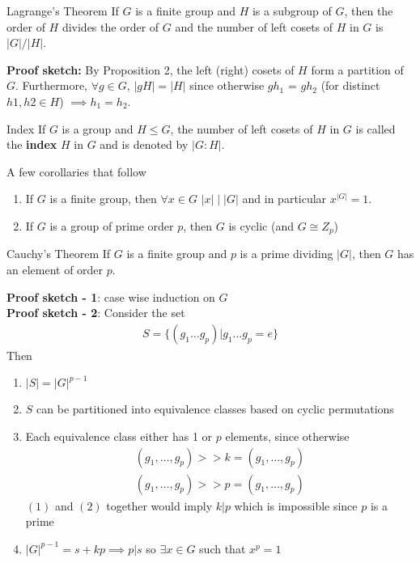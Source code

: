 \documentclass[titlepage, 12pt]{book}
\begin{document}
\begin{theorem}{Lagrange's Theorem}{}
    If $G$ is a finite group and $H$ is a subgroup of $G$, then the order of $H$
    divides the order of $G$ and the number of left cosets of $H$ in $G$ is
    $|G|/|H|$.
\end{theorem}
\textbf{Proof sketch:} By Proposition 2, the left (right) cosets of $H$ form a
partition of $G$. Furthermore, $\forall g\in G$, $|gH| = |H|$ since otherwise
$gh_1$ = $gh_2$ (for distinct $h1, h2\in H$) $\implies h_1 = h_2$.
\begin{definition}{Index}{}
    If $G$ is a group and $H\le G$, the number of left cosets of $H$ in $G$ is
    called the \textbf{index} $H$ in $G$ and is denoted by $|G:H|$.
\end{definition}
A few corollaries that follow
\begin{enumerate}
    \item If $G$ is a finite group, then $\forall x\in G$ $|x|\mid |G|$ and in
        particular $x^{|G|} = 1$.
    \item If $G$ is a group of prime order $p$, then $G$ is cyclic (and $G\cong
        Z_p$)
\end{enumerate}
\begin{theorem}{Cauchy's Theorem}{}
    If $G$ is a finite group and $p$ is a prime dividing $|G|$, then $G$ has an
    element of order $p$.
\end{theorem}
\textbf{Proof sketch - 1}: case wise induction on $G$\\
\textbf{Proof sketch - 2}: Consider the set
\begin{gather*}
    S = \{(g_1\dots g_p) | g_1\dots g_p = e\}
\end{gather*}
Then
\begin{enumerate}
    \item $|S| = |G|^{p-1}$
    \item $S$ can be partitioned into equivalence classes based on cyclic
        permutations
    \item Each equivalence class either has 1 or $p$ elements, since otherwise
        \begin{gather}
            (g_1,\dots,g_p)>>k = (g_1,\dots,g_p)\\
            (g_1,\dots,g_p)>>p = (g_1,\dots,g_p)
        \end{gather}
        $(1)$ and $(2)$ together would imply $k|p$ which is impossible since $p$
        is a prime
    \item $|G|^{p-1} = s + kp \implies p|s$ so $\exists x\in G$ such that $x^p = 1$
\end{enumerate}
\end{document}
